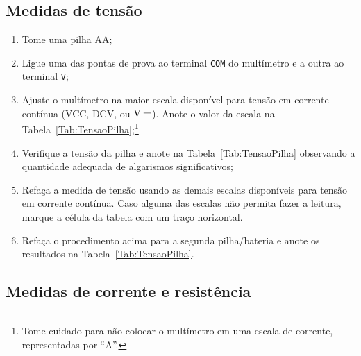 \subsection{Medidas de tensão} %
\begin{enumerate}
	\item Tome uma pilha AA;
	\item Ligue uma das pontas de prova ao terminal \texttt{COM} do multímetro e a outra ao terminal \texttt{V};
	\item Ajuste o multímetro na maior escala disponível para tensão em corrente contínua (VCC, DCV, ou $\rm{V}\mathdirectcurrent$). Anote o valor da escala na Tabela~\ref{Tab:TensaoPilha};\footnote{Tome cuidado para não colocar o multímetro em uma escala de corrente, representadas por ``A''.}
	\item Verifique a tensão da pilha e anote na Tabela~\ref{Tab:TensaoPilha} observando a quantidade adequada de algarismos significativos;
	\item Refaça a medida de tensão usando as demais escalas disponíveis para tensão em corrente contínua. Caso alguma das escalas não permita fazer a leitura, marque a célula da tabela com um traço horizontal.
	\item Refaça o procedimento acima para a segunda pilha/bateria e anote os resultados na Tabela~\ref{Tab:TensaoPilha}.
\end{enumerate}

\subsection{Medidas de corrente e resistência}

